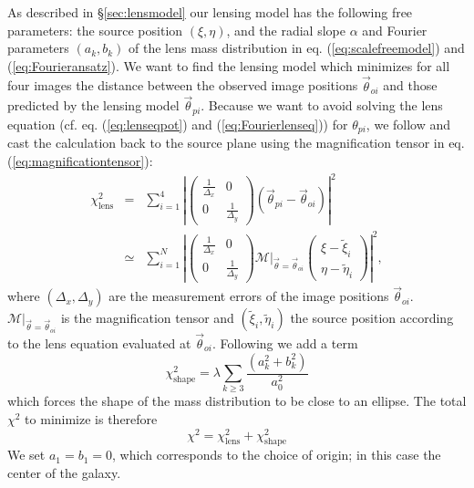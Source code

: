 \documentclass[useAMS,usenatbib]{mn2e}
\begin{document}
As described in \S\ref{sec:lensmodel} our lensing model has the following free parameters: the source position $(\xi,\eta)$, and the radial slope $\alpha$ and Fourier parameters $(a_k,b_k)$ of the lens mass distribution in eq. (\ref{eq:scalefreemodel}) and (\ref{eq:Fourieransatz}). We want to find the lensing model which minimizes for all four images the distance between the observed image positions $\vec{\theta}_{oi}$ and those predicted by the lensing model $\vec{\theta}_{pi}$. Because we want to avoid solving the lens equation (cf. eq. (\ref{eq:lenseqpot}) and (\ref{eq:Fourierlenseq})) for $\theta_{pi}$, we follow \citet{1991ApJ...373..354K} and cast the calculation back to the source plane using the magnification tensor in eq. (\ref{eq:magnificationtensor}):
\begin{eqnarray*}
\chi^2_\text{lens} &=& \sum_{i=1}^{4} \left|\left( \begin{matrix} \frac{1}{\Delta_x} & 0\\0 & \frac{1}{\Delta_y}\end{matrix}\right) \left( \vec{\theta}_{pi} - \vec{\theta}_{oi} \right)\right|^2\\
&\simeq& \sum_{i=1}^{N} \left|\left( \begin{matrix} \frac{1}{\Delta_x} & 0\\0 & \frac{1}{\Delta_y}\end{matrix}\right)  \left.\mathscr{M}\right|_{\vec{\theta}=\vec{\theta}_{oi}} \left( \begin{matrix} \xi - \tilde{\xi}_i \\ \eta - \tilde{\eta}_i \end{matrix} \right) \right|^2,
\end{eqnarray*}
where $(\Delta_x,\Delta_y)$ are the measurement errors of the image positions $\vec{\theta}_{oi}$. $\left.\mathscr{M}\right|_{\vec{\theta}=\vec{\theta}_{oi}}$ is the magnification tensor and $(\tilde{\xi}_i,\tilde{\eta}_i)$ the source position according to the lens equation evaluated at $\vec{\theta}_{oi}$. Following \citet{GlennEC} we add a term
\begin{equation*}
\chi^2_\text{shape} = \lambda \sum_{k \geq 3} \frac{\left(a_k^2 +b_k^2 \right)}{a_0^2} 
\end{equation*}
which forces the shape of the mass distribution to be close to an ellipse. The total $\chi^2$ to minimize is therefore
\begin{equation*}
\chi^2 = \chi^2_\text{lens} + \chi^2_\text{shape}
\end{equation*}
We set $a_1 = b_1 = 0$, which corresponds to the choice of origin; in this case the center of the galaxy.
\end{document}
